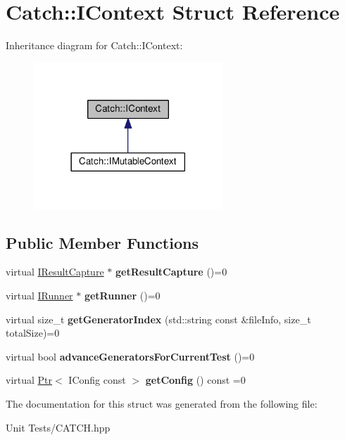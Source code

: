 \hypertarget{structCatch_1_1IContext}{}\section{Catch\+:\+:I\+Context Struct Reference}
\label{structCatch_1_1IContext}


Inheritance diagram for Catch\+:\+:I\+Context\+:
\nopagebreak
\begin{figure}[H]
\begin{center}
\leavevmode
\includegraphics[width=201pt]{structCatch_1_1IContext__inherit__graph}
\end{center}
\end{figure}
\subsection*{Public Member Functions}
\begin{DoxyCompactItemize}
\item 
virtual \hyperlink{structCatch_1_1IResultCapture}{I\+Result\+Capture} $\ast$ {\bfseries get\+Result\+Capture} ()=0\hypertarget{structCatch_1_1IContext_a684e4ae71d1fdf3060c352ecde1d122f}{}\label{structCatch_1_1IContext_a684e4ae71d1fdf3060c352ecde1d122f}

\item 
virtual \hyperlink{structCatch_1_1IRunner}{I\+Runner} $\ast$ {\bfseries get\+Runner} ()=0\hypertarget{structCatch_1_1IContext_af088415dde18d039ed5a2f95b02767c6}{}\label{structCatch_1_1IContext_af088415dde18d039ed5a2f95b02767c6}

\item 
virtual size\+\_\+t {\bfseries get\+Generator\+Index} (std\+::string const \&file\+Info, size\+\_\+t total\+Size)=0\hypertarget{structCatch_1_1IContext_a43e07088db43299ba129fbe6d3106e95}{}\label{structCatch_1_1IContext_a43e07088db43299ba129fbe6d3106e95}

\item 
virtual bool {\bfseries advance\+Generators\+For\+Current\+Test} ()=0\hypertarget{structCatch_1_1IContext_a806f7c4ed24d51adae90418e661b24b7}{}\label{structCatch_1_1IContext_a806f7c4ed24d51adae90418e661b24b7}

\item 
virtual \hyperlink{classCatch_1_1Ptr}{Ptr}$<$ I\+Config const  $>$ {\bfseries get\+Config} () const =0\hypertarget{structCatch_1_1IContext_aee81c415899262e096ad8d6f686fa365}{}\label{structCatch_1_1IContext_aee81c415899262e096ad8d6f686fa365}

\end{DoxyCompactItemize}


The documentation for this struct was generated from the following file\+:\begin{DoxyCompactItemize}
\item 
Unit Tests/C\+A\+T\+C\+H.\+hpp\end{DoxyCompactItemize}
